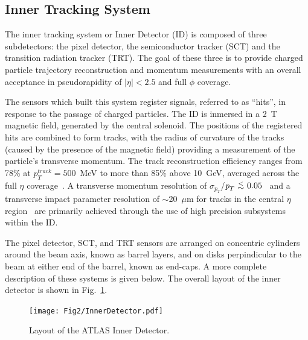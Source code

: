 \subsection{Inner Tracking System}\label{atlasID}

The inner tracking system or Inner Detector (ID) is composed of three subdetectors: the pixel detector, the semiconductor tracker (SCT) and the transition radiation tracker (TRT). The goal of these three is to provide charged particle trajectory reconstruction and momentum measurements with an overall acceptance in pseudorapidity of $|\eta| < 2.5$ and full $\phi$ coverage. 

The sensors which built this system register signals, referred to as ``hits'', in response to the passage of charged particles. The ID is inmersed in a 2~T magnetic field, generated by the central solenoid. The positions of the registered hits are combined to form tracks, with the radius of curvature  of the tracks (caused by the presence of the magnetic field) providing a measurement of the particle's transverse momentum. 
The track reconstruction efficiency ranges from 78\% at $p^{track}_{T} = 500$~MeV to more than 85\% above 10~GeV, averaged across the full $\eta$ coverage~\cite{chargemultiplicity}. A transverse momentum resolution of $\sigma_{p_T}$/$\pt \aplt 0.05$~\cite{ATLAS-CONF-2010-009} and a transverse impact parameter resolution of $\sim$20~$\mu$m  %
for tracks in the central $\eta$ region~\cite{ATLAS-CONF-2010-070} are primarily achieved through the use of high precision subsystems within the ID.

The pixel detector, SCT, and TRT sensors are arranged on concentric cylinders around the beam axis, known as barrel layers, and on disks perpindicular to the beam at either end of the barrel, known as end-caps. A more complete description of these systems is given below. The overall layout of the inner detector is shown in Fig.~\ref{fig:figinner}. 


\begin{figure}[htbp]
  \begin{center}
      \texttt{[image: Fig2/InnerDetector.pdf]}
    \caption{Layout of the ATLAS Inner Detector.}
    \label{fig:figinner}
  \end{center}
\end{figure}


